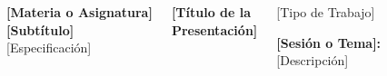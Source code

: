 \documentclass[11pt, aspectratio=169, spanish]{beamer}
\begin{document}
{
\begin{frame}[plain]
\vspace*{0.15cm}

\begin{columns}[T]


\begin{center}
{\normalsize\textbf{\textcolor{VerdeUNAL}{[Materia o Asignatura]}}}\\
{\normalsize\textbf{\textcolor{VerdeUNAL}{[Subtítulo]}}}\\
{\footnotesize\textcolor{VerdeUNAL}{[Especificación]}}
\end{center}

\vspace{0.15cm}

\begin{tcolorbox}[colback=VerdeUNAL!5,colframe=VerdeUNAL!80,boxrule=1pt,arc=2mm]
\begin{center}
{\large\textbf{[Título de la}} \\[0.1cm]
{\large\textbf{Presentación]}}
\end{center}
\end{tcolorbox}

\vspace{0.2cm}

\begin{block}{[Tipo de Trabajo]}
\begin{center}
{\small \textbf{[Sesión o Tema]:}}\\[0.1cm]
{\small [Descripción]}
\end{center}
\end{block}

\vspace{0.15cm}




\vspace{0.2cm}

\begin{tcolorbox}[colback=VerdeUNAL!10,colframe=VerdeUNAL!90,boxrule=1.5pt,arc=3mm,title={\centering\footnotesize\textbf{Información Académica}}]


\end{tcolorbox}
\end{columns}
\end{frame}}
\end{document}
